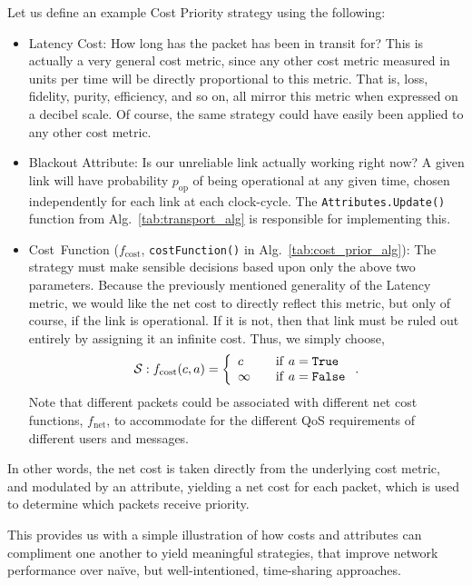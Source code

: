 \documentclass[aps,rmp,twocolumn,amsmath,amssymb,nofootinbib,superscriptaddress]{revtex4}
\begin{document}
Let us define an example {\sc Cost Priority} strategy using the following:
\begin{itemize}
\item {\sc Latency Cost}: How long has the packet has been in transit for? This is actually a very general cost metric, since any other cost metric measured in units per time will be directly proportional to this metric. That is, loss, fidelity, purity, efficiency, and so on, all mirror this metric when expressed on a decibel scale. Of course, the same strategy could have easily been applied to any other cost metric.
\item {\sc Blackout Attribute}: Is our unreliable link actually working right now? A given link will have probability $p_\mathrm{op}$ of being operational at any given time, chosen independently for each link at each clock-cycle. The {\tt Attributes.Update()} function from Alg.~\ref{tab:transport_alg} is responsible for implementing this.
\item \mbox{\sc Cost Function} ($f_\mathrm{cost}$, {\tt costFunction()} in Alg.~\ref{tab:cost_prior_alg}): The strategy must make sensible decisions based upon only the above two parameters. Because the previously mentioned generality of the {\sc Latency} metric, we would like the net cost to directly reflect this metric, but only of course, if the link is operational. If it is not, then that link must be ruled out entirely by assigning it an infinite cost. Thus, we simply choose,
\begin{align}
\mathcal{S} : f_\mathrm{cost}(c,a) = \left\{
\begin{array}{l l}
c & \quad \mathrm{if}~ a=\mathrm{\tt True} \\
\infty & \quad \mathrm{if}~ a=\mathrm{\tt False} \\
\end{array} \right..
\end{align}
Note that different packets could be associated with different net cost functions, $f_\mathrm{net}$, to accommodate for the different QoS requirements of different users and messages.
\end{itemize}

In other words, the net cost is taken directly from the underlying cost metric, and modulated by an attribute, yielding a net cost for each packet, which is used to determine which packets receive priority.

This provides us with a simple illustration of how costs and attributes can compliment one another to yield meaningful strategies, that improve network performance over na\"ive, but well-intentioned, time-sharing approaches.
\end{document}
